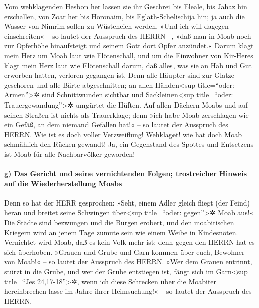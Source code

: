 Vom wehklagenden Hesbon her lassen sie ihr Geschrei bis
Eleale, bis Jahaz hin erschallen, von Zoar her bis Horonaim, bis
Eglath-Schelischija hin; ja auch die Wasser von Nimrim sollen zu
Wüsteneien werden. »Und ich will dagegen einschreiten« --
so lautet der Ausspruch des HERRN --, »daß man in Moab noch zur
Opferhöhe hinaufsteigt und seinem Gott dort Opfer anzündet.«
Darum klagt mein Herz um Moab laut wie Flötenschall, und
um die Einwohner von Kir-Heres klagt mein Herz laut wie Flötenschall
darum, daß alles, was sie an Hab und Gut erworben hatten, verloren
gegangen ist. Denn alle Häupter sind zur Glatze geschoren
und alle Bärte abgeschnitten; an allen Händen\textless sup title=``oder:
Armen''\textgreater✲ sind Schnittwunden sichtbar und
Sackleinen\textless sup title=``oder: Trauergewandung''\textgreater✲
umgürtet die Hüften. Auf allen Dächern Moabs und auf
seinen Straßen ist nichts als Trauerklage; denn »ich habe Moab
zerschlagen wie ein Gefäß, an dem niemand Gefallen hat!« -- so lautet
der Ausspruch des HERRN. Wie ist es doch voller
Verzweiflung! Wehklaget! wie hat doch Moab schmählich den Rücken
gewandt! Ja, ein Gegenstand des Spottes und Entsetzens ist Moab für alle
Nachbarvölker geworden!

\hypertarget{g-das-gericht-und-seine-vernichtenden-folgen-trostreicher-hinweis-auf-die-wiederherstellung-moabs}{%
\paragraph{g) Das Gericht und seine vernichtenden Folgen; trostreicher
Hinweis auf die Wiederherstellung
Moabs}\label{g-das-gericht-und-seine-vernichtenden-folgen-trostreicher-hinweis-auf-die-wiederherstellung-moabs}}

Denn so hat der HERR gesprochen: »Seht, einem Adler
gleich fliegt (der Feind) heran und breitet seine Schwingen
über\textless sup title=``oder: gegen''\textgreater✲ Moab aus!«
Die Städte sind bezwungen und die Burgen erobert, und den
moabitischen Kriegern wird an jenem Tage zumute sein wie einem Weibe in
Kindesnöten. Vernichtet wird Moab, daß es kein Volk mehr
ist; denn gegen den HERRN hat es sich überhoben. »Grauen
und Grube und Garn kommen über euch, Bewohner von Moab!« -- so lautet
der Ausspruch des HERRN. »Wer dem Grauen entrinnt, stürzt
in die Grube, und wer der Grube entstiegen ist, fängt sich im
Garn\textless sup title=``Jes 24,17-18''\textgreater✲, wenn ich diese
Schrecken über die Moabiter hereinbrechen lasse im Jahre ihrer
Heimsuchung!« -- so lautet der Ausspruch des HERRN.

